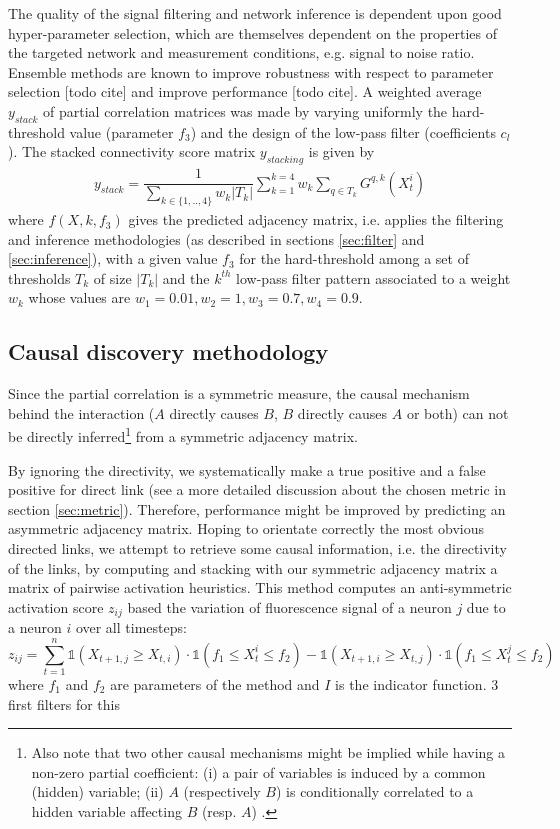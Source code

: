 \documentclass[wcp]{jmlr}
\begin{document}
The quality of the signal filtering and network inference is dependent upon
good hyper-parameter selection, which are themselves dependent on the properties
of the targeted network and measurement conditions, e.g. signal to noise ratio.
Ensemble methods are known to improve robustness with respect to parameter
selection [todo cite] and improve performance [todo cite].
A weighted average $y_{stack}$ of partial correlation matrices was made
by varying uniformly the hard-threshold value (parameter $f_3$) and the design
of the low-pass filter (coefficients $c_l$). The stacked connectivity score
matrix $y_{stacking}$ is given by
\begin{align}
y_{stack} =  \dfrac{1}{\sum_{k\in\{1,..,4\}} w_k |T_k|} \sum_{k=1}^{k=4}  w_k \sum_{q \in T_k} G^{q,k}(X_t^i)
\end{align}
where $f(X, k, f_3)$ gives the predicted adjacency matrix, i.e. applies the
filtering and inference methodologies (as described
in sections \ref{sec:filter} and \ref{sec:inference}), with a  given value
$f_3$ for the hard-threshold among a set of thresholds $T_k$ of size $|T_k|$
and the $k^{th}$ low-pass filter pattern associated to a weight $w_k$ whose
values are $w_1 = 0.01 , w_2 =1, w_3 = 0.7, w_4 = 0.9$.

\subsection{Causal discovery methodology}
Since the partial correlation is a symmetric measure, the causal mechanism behind the
interaction ($A$ directly causes $B$, $B$ directly causes $A$ or both) can not
be directly inferred\footnote{Also note that two other causal mechanisms might be
implied while having a non-zero partial coefficient: (i) a pair of variables
is induced by a common (hidden) variable; (ii) $A$ (respectively $B$) is
conditionally correlated to a hidden variable affecting $B$ (resp. $A$)
\cite{de2004discovery}.} from a symmetric adjacency matrix.

By ignoring the directivity, we systematically make a true positive and a
false positive for direct link (see a more detailed discussion about the
chosen metric in section \ref{sec:metric}). Therefore, performance might be
improved by predicting an asymmetric adjacency matrix. Hoping to orientate
correctly the most obvious directed links, we attempt to retrieve some causal
information, i.e. the directivity of the links, by computing and stacking with
our symmetric adjacency matrix a matrix of pairwise activation heuristics.
This method computes an anti-symmetric activation score $z_{ij}$ based the
variation of fluorescence signal of a neuron $j$ due to a neuron $i$ over all
timesteps: \[ z_{ij} = \sum_{t=1}^n \mathbb{1}(X_{t+1,j} \ge X_{t, i}) \cdot
\mathbb{1}(f_1\le X_t^i \le f_2) -  \mathbb{1}(X_{t+1,i} \ge X_{t, j}) \cdot
\mathbb{1}(f_1 \le X_t^j \le f_2) \]  where $f_1$ and $f_2$ are parameters of
the method and $I$ is the indicator function. %
3 first filters for this
\end{document}

